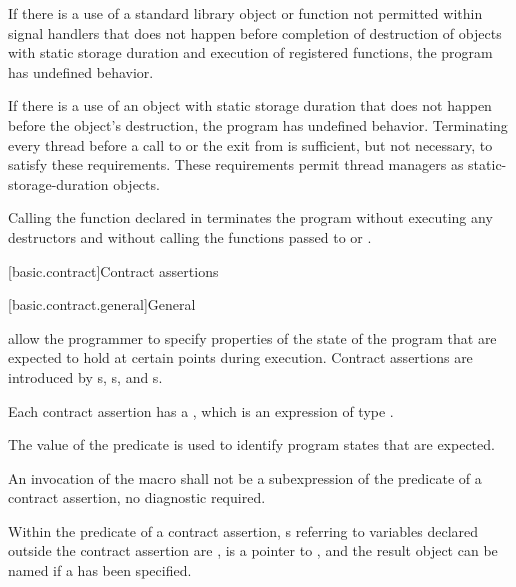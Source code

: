 \pnum
If there is a use of a standard library object or function not permitted within signal
handlers that does not happen before
completion of destruction of objects with static storage duration and execution of
 registered functions, the program has
undefined behavior.
\begin{note}
If there is a use of an object with static storage
duration that does not happen before the object's destruction, the program has undefined
behavior. Terminating every thread before a call to  or the exit from
 is sufficient, but not necessary, to satisfy these requirements. These
requirements permit thread managers as static-storage-duration objects.
\end{note}

\pnum
{}%
%
%
Calling the function  declared in
 terminates the program without executing any destructors
and without calling
the functions passed to  or .%

[basic.contract]{Contract assertions}%
%

[basic.contract.general]{General}%

\pnum
{}
allow the programmer to specify
properties of the state of the program
that are expected to hold at
certain points during execution.
Contract assertions are introduced by
s,
s, and
s.

\pnum
Each contract assertion has a ,
which is an expression of type .

\begin{note}
The value of the predicate is used to identify program states that are
expected.
\end{note}

\pnum
An invocation of the macro 
shall not be a subexpression
of the predicate of a contract assertion,
no diagnostic required.

\pnum
\begin{note}
Within the predicate of a contract assertion,
s referring to
variables declared outside the contract assertion
are ,
 is a pointer to ,
and the result object can be named
if a  has been specified.
\end{note}

